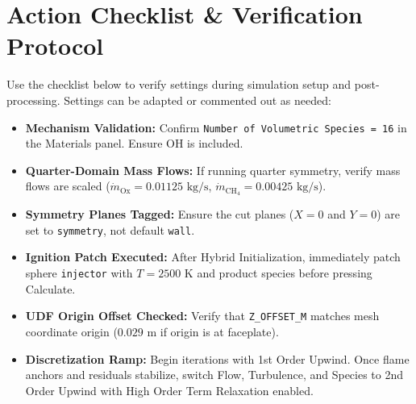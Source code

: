 \documentclass[11pt,a4paper]{article}
\begin{document}
\section{Action Checklist \& Verification Protocol}
Use the checklist below to verify settings during simulation setup and post-processing. Settings can be adapted or commented out as needed:

\begin{tcolorbox}[basebox, title={Pre-Run Verification Checklist}]
\begin{itemize}\setlength\itemsep{0.3em}
    \item[\checkmark] \textbf{Mechanism Validation:} Confirm \texttt{Number of Volumetric Species = 16} in the Materials panel. Ensure OH is included.
    \item[\checkmark] \textbf{Quarter-Domain Mass Flows:} If running quarter symmetry, verify mass flows are scaled ($\dot{m}_\text{Ox} = 0.01125\text{ kg/s}$, $\dot{m}_{\text{CH}_4} = 0.00425\text{ kg/s}$).
    \item[\checkmark] \textbf{Symmetry Planes Tagged:} Ensure the cut planes ($X=0$ and $Y=0$) are set to \texttt{symmetry}, not default \texttt{wall}.
    \item[\checkmark] \textbf{Ignition Patch Executed:} After Hybrid Initialization, immediately patch sphere \texttt{injector} with $T = 2500\text{ K}$ and product species before pressing Calculate.
    \item[\checkmark] \textbf{UDF Origin Offset Checked:} Verify that \texttt{Z\_OFFSET\_M} matches mesh coordinate origin ($0.029\text{ m}$ if origin is at faceplate).
    \item[\checkmark] \textbf{Discretization Ramp:} Begin iterations with 1st Order Upwind. Once flame anchors and residuals stabilize, switch Flow, Turbulence, and Species to 2nd Order Upwind with High Order Term Relaxation enabled.
\end{itemize}
\end{tcolorbox}

%
\end{document}
